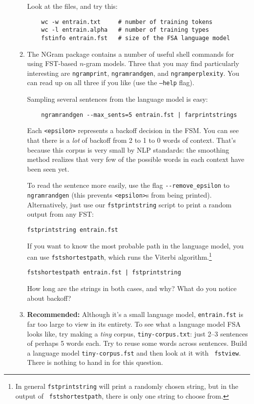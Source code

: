 \documentclass[11pt]{article}
\newcommand{\handinsym}{\color{blue}{\HandLeftUp}}
\newcounter{handin}
\newcommand{\handin}{\stepcounter{handin}\hspace{0pt}\marginpar{\hfill\handinsym$_{\arabic{handin}}$}}
\begin{document}
\begin{enumerate}[resume]
\begin{enumerate}
    Look at the files, and try this:
	\begin{verbatim}
	wc -w entrain.txt     # number of training tokens
	wc -l entrain.alpha   # number of training types
	fstinfo entrain.fst   # size of the FSA language model
	\end{verbatim}

  \item The NGram package contains a number of useful shell commands
    for using FST-based $n$-gram models.  Three that you may find
    particularly interesting are \texttt{ngramprint},
    \texttt{ngramrandgen}, and \texttt{ngramperplexity}. You can read
    up on all three if you like (use the \texttt{--help} flag).

    Sampling several sentences from the language model is easy:

	\begin{verbatim}
	ngramrandgen --max_sents=5 entrain.fst | farprintstrings
	\end{verbatim}

    Each \verb/<epsilon>/ represents a backoff decision in the FSM.
    You can see that there is a {\em lot} of backoff from 2 to 1 to 0
    words of context.  That's because this corpus is very small by NLP
    standards: the smoothing method realizes that very few of the
    possible words in each context have been seen yet.

    To read the sentence more easily, use the flag
    \verb/--remove_epsilon/ to \texttt{ngramrandgen} (this prevents
    \verb/<epsilon>/s from being printed).  Alternatively, just use
    our {\tt fstprintstring} script to print a random output from any
    FST:
\begin{verbatim}
fstprintstring entrain.fst
\end{verbatim}

    If you want to know the most probable path in the language model,
    you can use {\tt fstshortestpath}, which runs the Viterbi
    algorithm.\footnote{In general {\tt fstprintstring} will print a
      randomly chosen string, but in the output of {\tt
        fstshortestpath}, there is only one string to choose from.}
\begin{verbatim}
fstshortestpath entrain.fst | fstprintstring
\end{verbatim}

    \handin How long are the strings in both cases, and why?  What do you notice
    about backoff?

  \item {\bf Recommended:} Although it's a small language model, \texttt{entrain.fst} is
    far too large to view in its entirety.  To see what a language
    model FSA looks like, try making a \emph{tiny} corpus,
    \texttt{tiny-corpus.txt}: just 2--3 sentences of perhaps 5 words
    each.  Try to reuse some words across sentences.  Build a language
    model \texttt{tiny-corpus.fst} and then look at it with {\tt
      fstview}.  There is nothing to hand in for this question.


\end{enumerate}
\end{enumerate}
\end{document}
